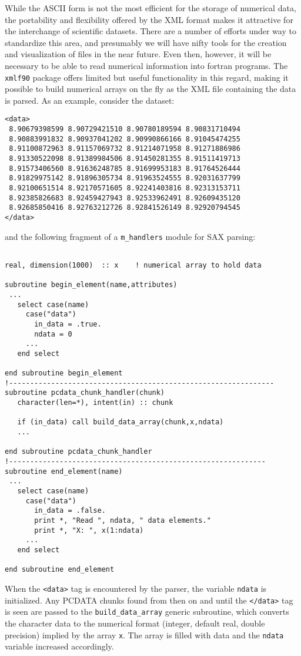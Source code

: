 \documentclass[11pt]{article}
\begin{document}
While the ASCII form is not the most efficient for the storage of
numerical data, the portability and flexibility offered by the XML
format makes it attractive for the interchange of scientific
datasets. There are a number of efforts under way to standardize this
area, and presumably we will have nifty tools for the creation and
visualization of files in the near future. Even then, however, it will
be necessary to be able to read numerical information into fortran
programs. The \texttt{xmlf90} package offers limited but useful
functionality in this regard, making it possible to build numerical
arrays on the fly as the XML file containing the data is parsed. As an
example, consider the dataset:
%
\begin{verbatim}
<data>
 8.90679398599 8.90729421510 8.90780189594 8.90831710494
 8.90883991832 8.90937041202 8.90990866166 8.91045474255
 8.91100872963 8.91157069732 8.91214071958 8.91271886986
 8.91330522098 8.91389984506 8.91450281355 8.91511419713
 8.91573406560 8.91636248785 8.91699953183 8.91764526444
 8.91829975142 8.91896305734 8.91963524555 8.92031637799
 8.92100651514 8.92170571605 8.92241403816 8.92313153711
 8.92385826683 8.92459427943 8.92533962491 8.92609435120
 8.92685850416 8.92763212726 8.92841526149 8.92920794545
</data>
\end{verbatim}
%
and the following fragment of a \texttt{m\_handlers} module for SAX parsing:
%
\begin{verbatim}

real, dimension(1000)  :: x    ! numerical array to hold data

subroutine begin_element(name,attributes)
 ...
   select case(name)
     case("data")
       in_data = .true.
       ndata = 0     
     ...
   end select
   
end subroutine begin_element
!---------------------------------------------------------------
subroutine pcdata_chunk_handler(chunk)
   character(len=*), intent(in) :: chunk

   if (in_data) call build_data_array(chunk,x,ndata)
   ...

end subroutine pcdata_chunk_handler
!-------------------------------------------------------------
subroutine end_element(name)
 ...
   select case(name)
     case("data")
       in_data = .false.
       print *, "Read ", ndata, " data elements."
       print *, "X: ", x(1:ndata)
     ...
   end select
   
end subroutine end_element
\end{verbatim}
%
When the \texttt{<data>} tag is encountered by the parser, the
variable \texttt{ndata} is initialized. Any PCDATA chunks found from
then on and until the \texttt{</data>} tag is seen are passed to the
\texttt{build\_data\_array} generic subroutine, which converts the
character data to the numerical format (integer, default real, double
precision) implied by the array \texttt{x}. The array is filled with
data and the \texttt{ndata} variable increased accordingly.
\end{document}
